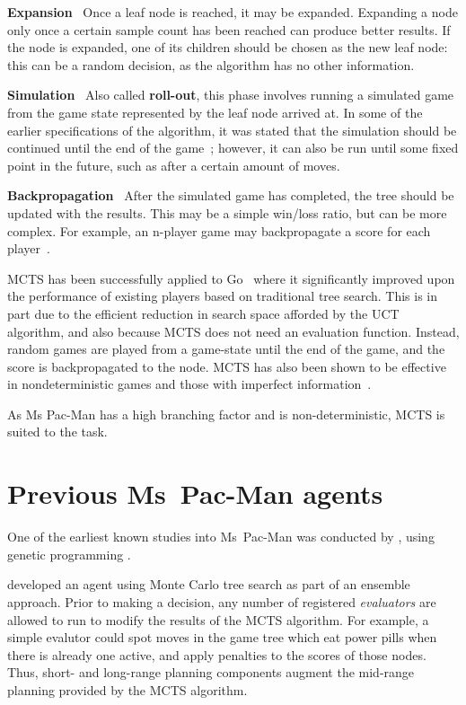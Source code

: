 \textbf{Expansion} ~Once a leaf node is reached, it may be expanded.  Expanding a node only once a certain sample count has been reached can produce better results.  If the node is expanded, one of its children should be chosen as the new leaf node: this can be a random decision, as the algorithm has no other information.

\textbf{Simulation} ~Also called \textbf{roll-out}, this phase involves running a simulated game from the game state represented by the leaf node arrived at.  In some of the earlier specifications of the algorithm, it was stated that the simulation should be continued until the end of the game~\citep{Chaslot2008}; however, it can also be run until some fixed point in the future, such as after a certain amount of moves.

\textbf{Backpropagation} ~After the simulated game has completed, the tree should be updated with the results.  This may be a simple win/loss ratio, but can be more complex.  For example, an n-player game may backpropagate a score for each player~\citep{Samothrakis2011}.

MCTS has been successfully applied to Go~\citep{Gelly2006} where it significantly improved upon the performance of existing players based on traditional tree search.  This is in part due to the efficient reduction in search space afforded by the UCT algorithm, and also because MCTS does not need an evaluation function.  Instead, random games are played from a game-state until the end of the game, and the score is backpropagated to the node.  MCTS has also been shown to be effective in nondeterministic games and those with imperfect information~\citep{Kocsis2006}.

As Ms Pac-Man has a high branching factor and is non-deterministic, MCTS is suited to the task.

\section{Previous Ms~Pac-Man agents}

One of the earliest known studies into Ms~Pac-Man was conducted by \citet{Koza1992}, using genetic programming .




\citet{Me2012} developed an agent using Monte Carlo tree search as part of an ensemble approach.  Prior to making a decision, any number of registered \emph{evaluators} are allowed to run to modify the results of the MCTS algorithm.  For example, a simple evalutor could spot moves in the game tree which eat power pills when there is already one active, and apply penalties to the scores of those nodes.  Thus, short- and long-range planning components augment the mid-range planning provided by the MCTS algorithm.

